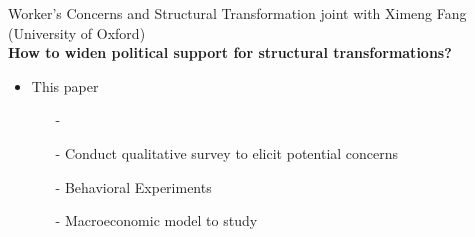 \begin{frame}{Worker's Concerns and Structural Transformation}
		\vspace{-5mm}
\hspace{-6mm}\footnotesize{joint with Ximeng Fang (University of Oxford)}\\

\textbf{\alert{How to widen political support for structural transformations?}}

\begin{itemize}
	\item This paper
	\begin{itemize}
		\item[-]
		\item[-] Conduct qualitative survey to elicit potential concerns
		\item[-] Behavioral Experiments
		\item[-] Macroeconomic model to study 
	\end{itemize}
\end{itemize}


\end{frame}